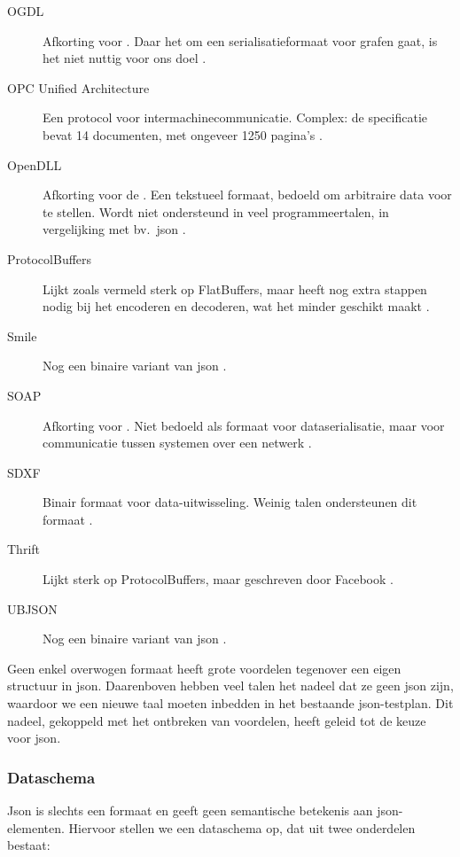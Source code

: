 \begin{description}
    \item[OGDL] Afkorting voor .
    Daar het om een serialisatieformaat voor grafen gaat, is het niet nuttig voor ons doel \autocite{ogdl}.
    \item[OPC Unified Architecture] Een protocol voor intermachinecommunicatie.
    Complex: de specificatie bevat 14 documenten, met ongeveer 1250 pagina's \autocite{tr62541}.
    \item[OpenDLL] Afkorting voor de .
    Een tekstueel formaat, bedoeld om arbitraire data voor te stellen.
    Wordt niet ondersteund in veel programmeertalen, in vergelijking met bv.\ json \autocite{openddl}.
    \item[ProtocolBuffers] Lijkt zoals vermeld sterk op FlatBuffers, maar heeft nog extra stappen nodig bij het encoderen en decoderen, wat het minder geschikt maakt \autocite{protobuf}.
    \item[Smile] Nog een binaire variant van json \autocite{smile}.
    \item[SOAP] Afkorting voor .
    Niet bedoeld als formaat voor dataserialisatie, maar voor communicatie tussen systemen over een netwerk \autocite{soap}.
    \item[SDXF] Binair formaat voor data-uitwisseling.
    Weinig talen ondersteunen dit formaat \autocite{rfc3072}.
    \item[Thrift] Lijkt sterk op ProtocolBuffers, maar geschreven door Facebook \autocite{slee2007}.
    \item[UBJSON] Nog een binaire variant van json \autocite{ubjson}.

\end{description}

Geen enkel overwogen formaat heeft grote voordelen tegenover een eigen structuur in json.
Daarenboven hebben veel talen het nadeel dat ze geen json zijn, waardoor we een nieuwe taal moeten inbedden in het bestaande json-testplan.
Dit nadeel, gekoppeld met het ontbreken van voordelen, heeft geleid tot de keuze voor json.

\subsubsection{Dataschema}

Json is slechts een formaat en geeft geen semantische betekenis aan json-elementen.
Hiervoor stellen we een dataschema op, dat uit twee onderdelen bestaat:

